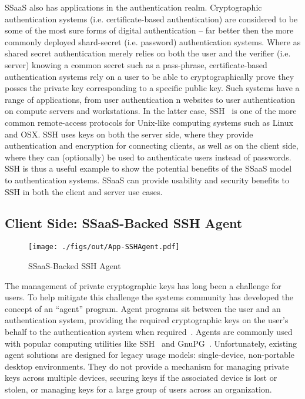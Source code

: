 SSaaS also has applications in the authentication realm. Cryptographic
authentication systems (i.e. certificate-based authentication) are
considered to be some of the most sure forms of digital authentication
-- far better then the more commonly deployed shard-secret
(i.e. password) authentication systems. Where as shared secret
authentication merely relies on both the user and the verifier
(i.e. server) knowing a common secret such as a pass-phrase,
certificate-based authentication systems rely on a user to be able to
cryptographically prove they posses the private key corresponding to a
specific public key. Such systems have a range of applications, from
user authentication n websites to user authentication on compute
servers and workstations. In the latter case, SSH~\cite{ylonen1996} is
one of the more common remote-access protocols for Unix-like computing
systems such as Linux and OSX. SSH uses keys on both the server side,
where they provide authentication and encryption for connecting
clients, as well as on the client side, where they can (optionally) be
used to authenticate users instead of passwords. SSH is thus a useful
example to show the potential benefits of the SSaaS model to
authentication systems. SSaaS can provide usability and security
benefits to SSH in both the client and server use cases.

\subsection{Client Side: SSaaS-Backed SSH Agent}

\begin{figure}[t]
  \centering
  \texttt{[image: ./figs/out/App-SSHAgent.pdf]}
  \caption{SSaaS-Backed SSH Agent}
  \label{fig:app-sshagent}
\end{figure}

The management of private cryptographic keys has long been a challenge
for users. To help mitigate this challenge the systems community has
developed the concept of an ``agent'' program. Agent programs sit
between the user and an authentication system, providing the required
cryptographic keys on the user's behalf to the authentication system
when required~\cite{cox2002}. Agents are commonly used with popular
computing utilities like SSH~\cite{ylonen1996} and
GnuPG~\cite{gnupg}. Unfortunately, existing agent solutions are
designed for legacy usage models: single-device, non-portable desktop
environments. They do not provide a mechanism for managing private
keys across multiple devices, securing keys if the associated device
is lost or stolen, or managing keys for a large group of users across
an organization.

